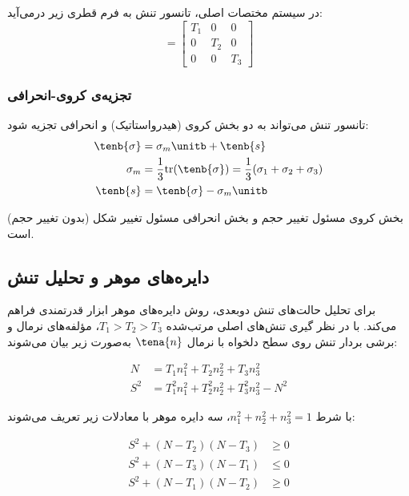 در سیستم مختصات اصلی، تانسور تنش به فرم قطری زیر درمی‌آید:
\begin{equation}
	[\tenb{T}] = \begin{bmatrix}
		T_1 & 0   & 0   \\
		0   & T_2 & 0   \\
		0   & 0   & T_3
	\end{bmatrix}
\end{equation}

\subsubsection{تجزیه‌ی کروی-انحرافی}
تانسور تنش می‌تواند به دو بخش کروی (هیدرواستاتیک) و انحرافی تجزیه شود:
\begin{align}
	\tenb{\sigma} & = \sigma_m \unitb + \tenb{s}                                                         \\
	\sigma_m      & = \frac{1}{3} \text{tr}(\tenb{\sigma}) = \frac{1}{3}(\sigma_1 + \sigma_2 + \sigma_3) \\
	\tenb{s}      & = \tenb{\sigma} - \sigma_m \unitb
\end{align}

بخش کروی مسئول تغییر حجم و بخش انحرافی مسئول تغییر شکل (بدون تغییر حجم) است.

\subsection{دایره‌های موهر و تحلیل تنش}

برای تحلیل حالت‌های تنش دوبعدی، روش دایره‌های موهر ابزار قدرتمندی فراهم می‌کند. با در نظر گیری تنش‌های اصلی مرتب‌شده $T_1 > T_2 > T_3$، مؤلفه‌های نرمال و برشی بردار تنش روی سطح دلخواه با نرمال $\tena{n}$ به‌صورت زیر بیان می‌شوند:

\begin{align}
	N   & = T_1 n_1^2 + T_2 n_2^2 + T_3 n_3^2             \\
	S^2 & = T_1^2 n_1^2 + T_2^2 n_2^2 + T_3^2 n_3^2 - N^2
\end{align}

با شرط $n_1^2 + n_2^2 + n_3^2 = 1$، سه دایره موهر با معادلات زیر تعریف می‌شوند:

\begin{align}
	S^2 + (N - T_2)(N - T_3) & \geq 0 \\
	S^2 + (N - T_3)(N - T_1) & \leq 0 \\
	S^2 + (N - T_1)(N - T_2) & \geq 0
\end{align}

